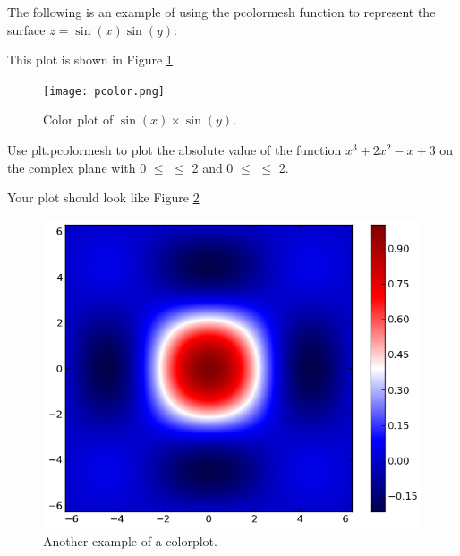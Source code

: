 The following is an example of using the pcolormesh function to represent 
the surface $z=\sin(x)\sin(y)$:


 
This plot is shown in Figure \ref{mpl:pcmexample}

\begin{figure} 
\texttt{[image: pcolor.png]}
\caption{Color plot of $\sin\left(x\right)\times\sin\left(y\right)$.}
\label{mpl:pcmexample} 
\end{figure}

\begin{problem} Use plt.pcolormesh to plot the absolute value of the function $x^3 +2x^2 -x +3$ on the complex plane with 0 $\leq$  $\leq$ 2 and 0 $\leq$  $\leq$ 2. 

Your plot should look like Figure \ref{mpl:pcolormesh} 
\end{problem}


\begin{figure} 
\includegraphics[width=\textwidth]{pcolor2.png}
\caption{Another example of a colorplot.} 
\label{mpl:pcolormesh}
\end{figure}


